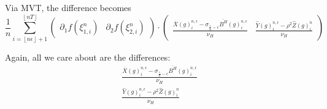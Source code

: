 \documentclass[12pt,letterpaper]{article}
\theoremstyle{definition}
\begin{document}
Via MVT, the difference becomes
\begin{equation}
  \frac{1}{n}\sum_{i=\left\lfloor n\epsilon \right\rfloor + 1}^{\left\lfloor nT \right\rfloor} \begin{pmatrix} \partial_1 f(\xi_{1,i}^n) & \partial_2 f(\xi_{2,i}^n) \end{pmatrix} \cdot \begin{pmatrix} \frac{\overline{X}(g)^{n,\epsilon}_i - \sigma_{\frac{i}{n}-\epsilon}\overline{B^H}(g)^{n,\epsilon}_i}{\nu_H} & \frac{\widehat{Y}(g)^{n,\epsilon}_i - \rho^2\widehat{Z}(g)^{n}_i}{\nu_H} \end{pmatrix}
\end{equation}

Again, all we care about are the differences:
\begin{gather}
  \frac{\overline{X}(g)^{n,\epsilon}_i - \sigma_{\frac{i}{n}-\epsilon}\overline{B^H}(g)^{n,\epsilon}_i}{\nu_H} \\
  \frac{\widehat{Y}(g)^{n,\epsilon}_i - \rho^2\widehat{Z}(g)^{n}_i}{\nu_H}
\end{gather}
\end{document}
